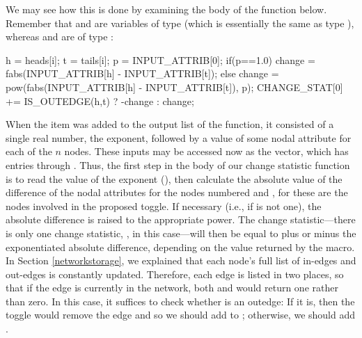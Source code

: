 \documentclass[article]{jss}
\begin{document}
We may see how this is done by examining the body of the  function below.
Remember that  and  are variables of type  (which is essentially
the same as type ), whereas  and  are of type
:
\begin{CodeChunk}
\begin{CodeInput}
    h = heads[i]; t = tails[i]; 
    p = INPUT_ATTRIB[0];
    if(p==1.0){
      change = fabs(INPUT_ATTRIB[h] - INPUT_ATTRIB[t]);
    }else{
      change = pow(fabs(INPUT_ATTRIB[h] - INPUT_ATTRIB[t]), p);
    }
    CHANGE_STAT[0] += IS_OUTEDGE(h,t) ? -change : change;
\end{CodeInput}
\end{CodeChunk}
When the  item was added to the output list of the
 function, it consisted of a single
real number, the exponent, followed by a value of some nodal attribute
for each of the $n$ nodes.  These inputs may be accessed now as the
 vector, which has entries
 through .
Thus, the first step in the body of our change statistic function is to read the value of
the exponent (), then calculate the absolute value of the
difference of the nodal attributes for the nodes numbered  and ,
for these are the nodes involved in the proposed toggle.  If necessary (i.e., 
if  is not one),
the absolute difference is raised to the appropriate power.  
The change statistic---there is only one change statistic, 
, in this case---will then be equal to plus or minus
the exponentiated absolute difference, depending on the value
returned by the  macro.  In Section \ref{networkstorage},
we explained that each node's full list of in-edges and out-edges is constantly
updated.  Therefore, each edge is listed in two places, so that if the
edge  is currently in the network, both 
 and  would return one
rather than zero.  In this case, it suffices to check whether  is
an outedge:  If it is, then the toggle would remove the edge and so 
we should add  to ; otherwise,
we should add .
\end{document}
